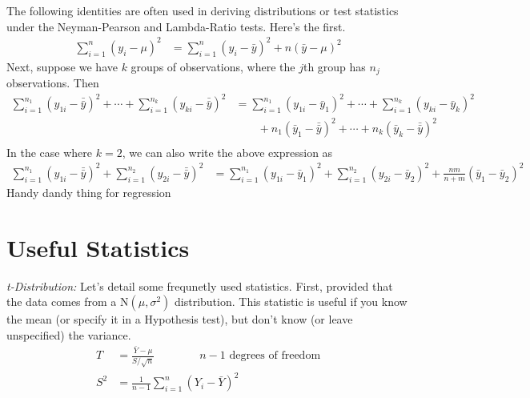 \documentclass[a4paper,12pt]{scrartcl}
\begin{document}
The following identities are often used in deriving distributions
or test statistics under the Neyman-Pearson and Lambda-Ratio tests.
Here's the first.
\begin{align*}
   \sum^n_{i=1} (y_i - \mu)^2 &= \sum^n_{i=1} (y_i - \bar{y})^2
      + n(\bar{y}-\mu)^2
\end{align*}
Next, suppose we have $k$ groups of observations, where the $j$th
group has $n_j$ observations. Then
\begin{align*}
   \sum^{n_1}_{i=1} (y_{1i}-\bar{\bar{y}})^2 + \cdots + 
   \sum^{n_k}_{i=1} (y_{ki}-\bar{\bar{y}})^2 &=
   \sum^{n_1}_{i=1} (y_{1i}-\bar{y}_1)^2 + \cdots + 
   \sum^{n_k}_{i=1} (y_{ki}-\bar{y}_k)^2 \\
   &\qquad + n_1(\bar{y}_1 - \bar{\bar{y}})^2+ \cdots + 
   n_k(\bar{y}_k - \bar{\bar{y}})^2\\
\end{align*}
In the case where $k=2$, we can also write the above expression as
\begin{align*}
   \sum^{n_1}_{i=1} (y_{1i}-\bar{\bar{y}})^2 +  
   \sum^{n_2}_{i=1} (y_{2i}-\bar{\bar{y}})^2 &=
   \sum^{n_1}_{i=1} (y_{1i}-\bar{y}_1)^2 + 
   \sum^{n_2}_{i=1} (y_{2i}-\bar{y}_2)^2 
      + \frac{nm}{n+m}(\bar{y}_1 -\bar{y}_2)^2
\end{align*}
Handy dandy thing for regression





\section{Useful Statistics}

{\sl t-Distribution:} 
Let's detail some frequnetly used statistics. First, provided that the
data comes from a N$(\mu,\sigma^2)$ distribution. This statistic 
is useful if you know the mean (or specify it in a Hypothesis test),
but don't know (or leave unspecified) the variance.
\begin{align*}
   T &= \frac{\bar{Y} -\mu}{S/\sqrt{n}} \qquad \qquad
      \text{$n-1$ degrees of freedom}\\
   S^2 &= \frac{1}{n-1}\sum^n_{i=1} (Y_i - \bar{Y})^2
\end{align*}
\end{document}
